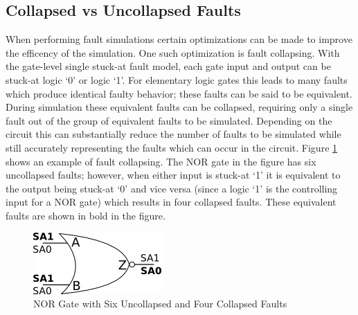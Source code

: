 \documentclass[12pt]{report}
\begin{document}
\subsection{Collapsed vs Uncollapsed Faults}
When performing fault simulations certain optimizations can be made to improve the efficency of the simulation.  One such optimization is fault collapsing.  With the gate-level single stuck-at fault model, each gate input and output can be stuck-at logic `0' or logic `1'.  For elementary logic gates this leads to many faults which produce identical faulty behavior; these faults can be said to be equivalent\cite{defectforcmos}.  During simulation these equivalent faults can be collapsed, requiring only a single fault out of the group of equivalent faults to be simulated\cite{defectforcmos}.  Depending on the circuit this can substantially reduce the number of faults to be simulated while still accurately representing the faults which can occur in the circuit\cite{defectforcmos}.  Figure \ref{fig:faultcollapse} shows an example of fault collapsing.  The NOR gate in the figure has six uncollapsed faults; however, when either input is stuck-at `1' it is equivalent to the output being stuck-at `0' and vice versa (since a logic `1' is the controlling input for a NOR gate) which results in four collapsed faults.  These equivalent faults are shown in bold in the figure.
\begin{figure}
	\begin{center}
		\includegraphics[scale=1]{images/nor-faultcollapse}
	\end{center}
  \caption{NOR Gate with Six Uncollapsed and Four Collapsed Faults}
  \label{fig:faultcollapse}
\end{figure}
\end{document}
